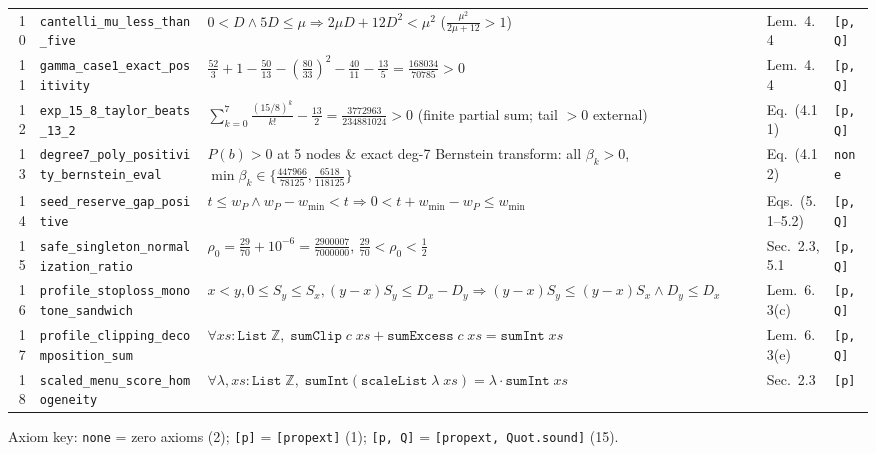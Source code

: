 \documentclass[10pt,twocolumn]{article}
\newcommand{\ZZ}{\mathbb{Z}}
\begin{document}
\begin{table}[t]
{\begin{tabular}{@{}rllll@{}}
10 & \texttt{cantelli\_mu\_less\_than\_five} & $0<D \land 5D\le \mu \Rightarrow 2\mu D + 12 D^2 < \mu^2$ ($\frac{\mu^2}{2\mu+12}>1$) & Lem.~4.4 & \texttt{[p, Q]} \\
11 & \texttt{gamma\_case1\_exact\_positivity} & $\frac{52}{3}+1-\frac{50}{13}-(\frac{80}{33})^2-\frac{40}{11}-\frac{13}{5} = \frac{168034}{70785} > 0$ & Lem.~4.4 & \texttt{[p, Q]} \\
12 & \texttt{exp\_15\_8\_taylor\_beats\_13\_2} & $\sum_{k=0}^7 \frac{(15/8)^k}{k!} - \frac{13}{2} = \frac{3772963}{234881024} > 0$ (finite partial sum; tail $>0$ external) & Eq.~(4.11) & \texttt{[p, Q]} \\
13 & \texttt{degree7\_poly\_positivity\_bernstein\_eval} & $P(b){>}0$ at 5 nodes \& exact deg-7 Bernstein transform: all $\beta_k{>}0$, $\min\beta_k \in\{\frac{447966}{78125},\frac{6518}{118125}\}$ & Eq.~(4.12) & \texttt{none} \\
14 & \texttt{seed\_reserve\_gap\_positive} & $t\le w_P \land w_P - w_{\min} < t \Rightarrow 0 < t + w_{\min} - w_P \le w_{\min}$ & Eqs.~(5.1--5.2) & \texttt{[p, Q]} \\
15 & \texttt{safe\_singleton\_normalization\_ratio} & $\rho_0 = \frac{29}{70}+10^{-6} = \frac{2900007}{7000000}$, $\frac{29}{70} < \rho_0 < \frac{1}{2}$ & Sec.~2.3, 5.1 & \texttt{[p, Q]} \\
16 & \texttt{profile\_stoploss\_monotone\_sandwich} & $x<y, 0\le S_y\le S_x, (y-x)S_y \le D_x{-}D_y \Rightarrow (y-x)S_y\le (y-x)S_x \land D_y\le D_x$ & Lem.~6.3(c) & \texttt{[p, Q]} \\
17 & \texttt{profile\_clipping\_decomposition\_sum} & $\forall xs:\texttt{List}\;\ZZ,\; \texttt{sumClip}\;c\;xs + \texttt{sumExcess}\;c\;xs = \texttt{sumInt}\;xs$ & Lem.~6.3(e) & \texttt{[p, Q]} \\
18 & \texttt{scaled\_menu\_score\_homogeneity} & $\forall \lambda, xs:\texttt{List}\;\ZZ,\; \texttt{sumInt}(\texttt{scaleList}\;\lambda\;xs) = \lambda\cdot \texttt{sumInt}\;xs$ & Sec.~2.3 & \texttt{[p]} \\
\bottomrule
\end{tabular}}
\vspace{-0.3em}
\begin{flushleft}
\tiny Axiom key: \texttt{none} = zero axioms (2); \texttt{[p]} = \texttt{[propext]} (1); \texttt{[p, Q]} = \texttt{[propext, Quot.sound]} (15).
\end{flushleft}
\vspace{-0.5em}
\end{table}
\end{document}
